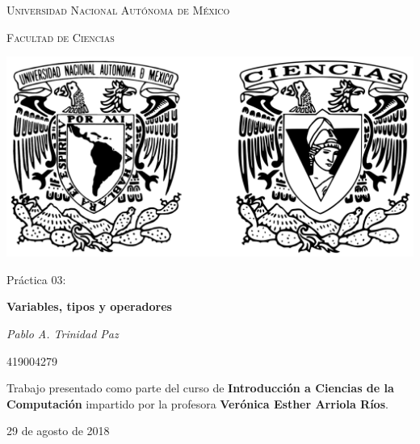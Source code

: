 \documentclass[11pt,letterpaper]{article}
\begin{document}
\begin{titlepage}
    \centering

    {\scshape\LARGE Universidad Nacional Autónoma de México \par}

    \vspace{1cm}
    {\scshape\Large Facultad de Ciencias\par}
    \vspace{1.5cm}

    \begin{center}
        \includegraphics[scale=.1]{../../assets/img/logo.png}
    \end{center}

    \vspace{.8 cm}

    {\LARGE Práctica 03: \par}
    {\huge\bfseries Variables, tipos y operadores \par}

    \vspace{0.5cm}
    {\large\itshape Pablo A. Trinidad Paz\par}
    419004279

    \vfill

    Trabajo presentado como parte del curso de \textbf{Introducción a Ciencias de la Computación}
    impartido por la profesora \textbf{Verónica Esther Arriola Ríos}. \par
    \vspace{0.1cm}
    {\large 29 de agosto de 2018\par}
\end{titlepage}
\end{document}
